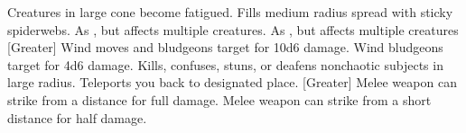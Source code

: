     {Creatures in large cone become fatigued.}
    {Fills medium radius spread with sticky spiderwebs.}
    {As , but affects multiple creatures.}
    {As , but affects multiple creatures}
[Greater]
    {Wind moves and bludgeons target for 10d6 damage.}
    {Wind bludgeons target for 4d6 damage.}
    {Kills, confuses, stuns, or deafens nonchaotic subjects in large radius.}
    {Teleports you back to designated place.}
[Greater]
    {Melee weapon can strike from a distance for full damage.}
    {Melee weapon can strike from a short distance for half damage.}
